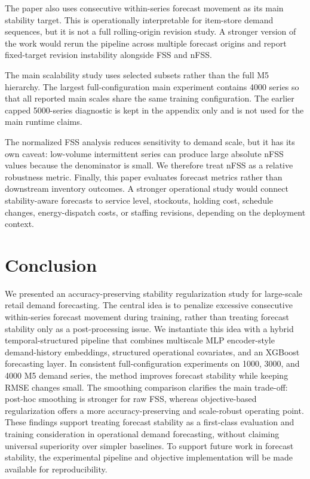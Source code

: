 \documentclass[10pt,conference]{IEEEtran}
\begin{document}
The paper also uses consecutive within-series forecast movement as its main stability target. This is operationally interpretable for item-store demand sequences, but it is not a full rolling-origin revision study. A stronger version of the work would rerun the pipeline across multiple forecast origins and report fixed-target revision instability alongside FSS and nFSS.

The main scalability study uses selected subsets rather than the full M5 hierarchy. The largest full-configuration main experiment contains 4000 series so that all reported main scales share the same training configuration. The earlier capped 5000-series diagnostic is kept in the appendix only and is not used for the main runtime claims.

The normalized FSS analysis reduces sensitivity to demand scale, but it has its own caveat: low-volume intermittent series can produce large absolute nFSS values because the denominator is small. We therefore treat nFSS as a relative robustness metric. Finally, this paper evaluates forecast metrics rather than downstream inventory outcomes. A stronger operational study would connect stability-aware forecasts to service level, stockouts, holding cost, schedule changes, energy-dispatch costs, or staffing revisions, depending on the deployment context.


\FloatBarrier
\section{Conclusion}
We presented an accuracy-preserving stability regularization study for large-scale retail demand forecasting. The central idea is to penalize excessive consecutive within-series forecast movement during training, rather than treating forecast stability only as a post-processing issue. We instantiate this idea with a hybrid temporal-structured pipeline that combines multiscale MLP encoder-style demand-history embeddings, structured operational covariates, and an XGBoost forecasting layer. In consistent full-configuration experiments on 1000, 3000, and 4000 M5 demand series, the method improves forecast stability while keeping RMSE changes small. The smoothing comparison clarifies the main trade-off: post-hoc smoothing is stronger for raw FSS, whereas objective-based regularization offers a more accuracy-preserving and scale-robust operating point. These findings support treating forecast stability as a first-class evaluation and training consideration in operational demand forecasting, without claiming universal superiority over simpler baselines.
To support future work in forecast stability, the experimental pipeline and 
objective implementation will be made available for reproducibility.
\end{document}
